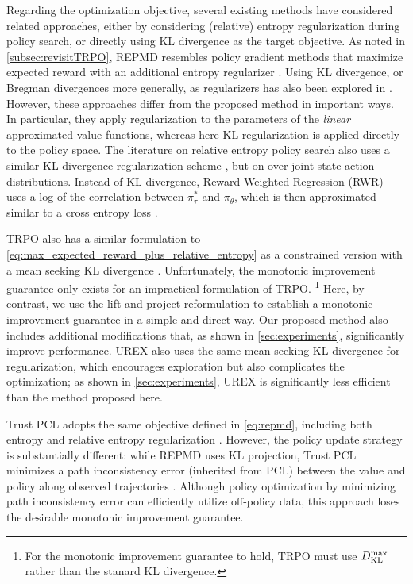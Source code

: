 Regarding the optimization objective,
several existing methods have considered related approaches,
either by considering (relative) entropy regularization during policy search,
or directly using KL divergence as the target objective. 
As noted in \cref{subsec:revisitTRPO},
REPMD resembles policy gradient methods that maximize expected reward
with an additional entropy regularizer
\citep{williams1991function,fox2015taming,nachum2017bridging}.
Using KL divergence, or Bregman divergences more generally,
as regularizers has also been explored
in \citet{liu2015finite,thomas2013projected,mahadevan2012sparse}.
However, these approaches differ from the proposed method
in important ways.
In particular, they apply regularization to the parameters of the
\emph{linear} approximated value functions, whereas here KL regularization
is applied directly to the policy space.
The literature on relative entropy policy search also uses a similar
KL divergence regularization scheme
\citep{peters2010relative,van2015learning},
but on over joint state-action distributions.
Instead of KL divergence, Reward-Weighted Regression (RWR) uses
a log of the correlation between $\pi^*_\tau$ and $\pi_\theta$,
which is then approximated similar to a cross entropy loss
\citep{peters2007reinforcement,wierstra2008episodic}.

TRPO also has a similar formulation to
\cref{eq:max_expected_reward_plus_relative_entropy}
as a constrained version with a mean seeking KL divergence
\citep{schulman2015trust}. 
Unfortunately, the monotonic improvement guarantee only exists for an
impractical formulation of TRPO.%
%
\footnote{
For the monotonic improvement guarantee to hold,
TRPO must use $D_{\mathrm{KL}}^{\max} $ rather than the stanard KL divergence.
} 
Here, by contrast,
we use the lift-and-project reformulation to establish a monotonic
improvement guarantee in a simple and direct way.
Our proposed method also includes additional modifications that,
as shown in \ref{sec:experiments}, significantly improve performance.
UREX also uses the same mean seeking KL divergence for regularization,
which encourages exploration but also complicates the optimization;
as shown in \ref{sec:experiments},
UREX is significantly less efficient than the method proposed here.

Trust PCL adopts the same objective defined in \cref{eq:repmd},
including both entropy and relative entropy regularization
\citep{nachum2017trust}.
However, the policy update strategy is substantially different:
while REPMD uses KL projection, Trust PCL
minimizes a path inconsistency error (inherited from PCL)
between the value and policy along observed trajectories
\citep{nachum2017bridging}.
Although policy optimization by minimizing path inconsistency error
can efficiently utilize off-policy data, this approach loses the 
desirable monotonic improvement guarantee.

